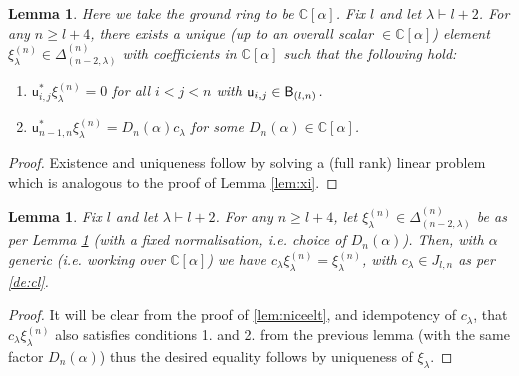 \documentclass{article}
\newcommand{\ppm}[1]{\textcolor{red}{#1}}
\newcommand{\bajm}[1]{\textcolor{blue}{#1}}
\newtheorem{lemma}[theorem]{Lemma}
\theoremstyle{definition}
\newcommand{\xx}{\alpha}       %
\def\uu{{\mathsf u}} %
\def\a{\alpha}
\def\l{\lambda}
\def\C{\mathbb{C}}
\def\Z{\mathbb{Z}}
\numberwithin{equation}{subsection}
\begin{document}
\begin{lemma}\label{le:xi2}
Here we take the ground ring to be $\C[\xx]$. %
    Fix $l$ and let $\l\vdash l+2$. For any $n\geq l+4$, there exists a unique (up to an overall scalar $\in \C[\a]$) element $\xi^{(n)}_\l\in \Delta^{(n)}_{(n-2,\l)}$ with coefficients in $\C[\a]$ 
    such that the following hold:
    \begin{enumerate}
        \item $\uu^*_{i,j} \xi^{(n)}_{\l}=0$ for all $i<j<n$ with $\uu_{i,j}\in \BBB_{(l,n)}$.
        \item $\uu^*_{n-1,n} \xi^{(n)}_{\l}=D_n(\a) c_\l $ for some $D_n(\a)\in \C[\a]$.  
    \end{enumerate}
\end{lemma}
\begin{proof}
    Existence and uniqueness follow by solving a (full rank) linear problem which is analogous to the proof of Lemma \ref{lem:xi}. 
\end{proof}
\begin{lemma}\label{lem:cxi} Fix $l$ and let $\l\vdash l+2$. For any $n\geq l+4$, let $\xi^{(n)}_\l\in \Delta^{(n)}_{(n-2,\l)}$ be as per Lemma \ref{le:xi2} (with a fixed normalisation, \textit{i.e.} choice of $D_n(\a)$). Then, with $\a$ generic (i.e. working over $\C[\a]$) we have $c_\l  \xi^{(n)}_\l=\xi^{(n)}_\l$, with $c_\l\in J_{l,n}$ as per \ref{de:cl}.   
\end{lemma}
\begin{proof} 
It will be clear from the proof of \ref{lem:niceelt}, and idempotency of $c_\l$, that $c_\l  \xi^{(n)}_\l$ also satisfies conditions 1. and 2. from the previous lemma (with the same factor $D_n(\a)$) thus the desired equality follows by uniqueness of $\xi_\l$.
\end{proof}
\end{document}
